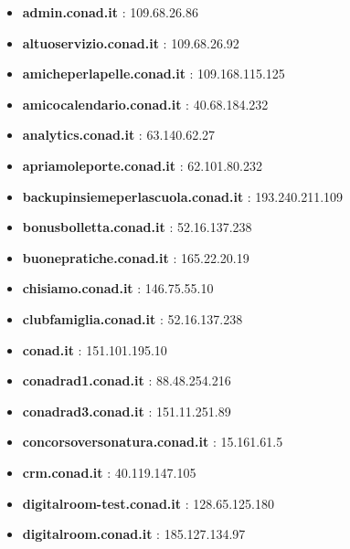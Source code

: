 \documentclass{article}
\begin{document}
\begin{itemize}
    
        \item \textbf{ admin.conad.it }: 109.68.26.86
    
        \item \textbf{ altuoservizio.conad.it }: 109.68.26.92
    
        \item \textbf{ amicheperlapelle.conad.it }: 109.168.115.125
    
        \item \textbf{ amicocalendario.conad.it }: 40.68.184.232
    
        \item \textbf{ analytics.conad.it }: 63.140.62.27
    
        \item \textbf{ apriamoleporte.conad.it }: 62.101.80.232
    
        \item \textbf{ backupinsiemeperlascuola.conad.it }: 193.240.211.109
    
        \item \textbf{ bonusbolletta.conad.it }: 52.16.137.238
    
        \item \textbf{ buonepratiche.conad.it }: 165.22.20.19
    
        \item \textbf{ chisiamo.conad.it }: 146.75.55.10
    
        \item \textbf{ clubfamiglia.conad.it }: 52.16.137.238
    
        \item \textbf{ conad.it }: 151.101.195.10
    
        \item \textbf{ conadrad1.conad.it }: 88.48.254.216
    
        \item \textbf{ conadrad3.conad.it }: 151.11.251.89
    
        \item \textbf{ concorsoversonatura.conad.it }: 15.161.61.5
    
        \item \textbf{ crm.conad.it }: 40.119.147.105
    
        \item \textbf{ digitalroom-test.conad.it }: 128.65.125.180
    
        \item \textbf{ digitalroom.conad.it }: 185.127.134.97
    

\end{itemize}
\end{document}
